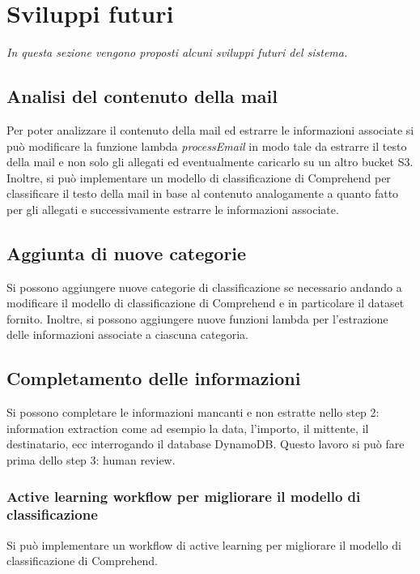 \chapter{Sviluppi futuri}
\label{cap:sviluppi-futuri}
\emph{In questa sezione vengono proposti alcuni sviluppi futuri del sistema.}
\section{Analisi del contenuto della mail}
Per poter analizzare il contenuto della mail ed estrarre le informazioni associate si può modificare la funzione lambda \textit{processEmail} in modo tale da estrarre il testo della mail e non solo gli allegati ed eventualmente caricarlo su un altro bucket S3.\\
Inoltre, si può implementare un modello di classificazione di Comprehend per classificare il testo della mail in base al contenuto analogamente a quanto fatto per gli allegati e successivamente estrarre le informazioni associate. 
\section{Aggiunta di nuove categorie}
Si possono aggiungere nuove categorie di classificazione se necessario andando a modificare il modello di classificazione di Comprehend e in particolare il dataset fornito. Inoltre, si possono aggiungere nuove funzioni lambda per l'estrazione delle informazioni associate a ciascuna categoria.
\section{Completamento delle informazioni}
Si possono completare le informazioni mancanti e non estratte nello step 2: information extraction come ad esempio la data, l'importo, il mittente, il destinatario, ecc interrogando il database DynamoDB. Questo lavoro si può fare prima dello step 3: human review. 
\subsection{Active learning workflow per migliorare il modello di classificazione}


Si può implementare un workflow di active learning per migliorare il modello di classificazione di Comprehend.

